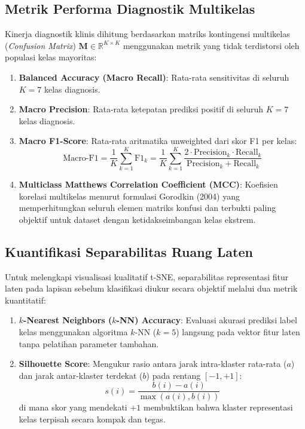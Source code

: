 \subsection{Metrik Performa Diagnostik Multikelas} \label{III.MetrikKlasifikasi}
Kinerja diagnostik klinis dihitung berdasarkan matriks kontingensi multikelas (\textit{Confusion Matrix}) $\mathbf{M} \in \mathbb{R}^{K \times K}$ menggunakan metrik yang tidak terdistorsi oleh populasi kelas mayoritas:
\begin{enumerate}[noitemsep]
	\item \textbf{Balanced Accuracy (Macro Recall)}: Rata-rata sensitivitas di seluruh $K=7$ kelas diagnosis.
	\item \textbf{Macro Precision}: Rata-rata ketepatan prediksi positif di seluruh $K=7$ kelas diagnosis.
	\item \textbf{Macro F1-Score}: Rata-rata aritmatika unweighted dari skor F1 per kelas:
	\begin{equation}
		\text{Macro-F1} = \frac{1}{K} \sum_{k=1}^{K} \text{F1}_k = \frac{1}{K} \sum_{k=1}^{K} \frac{2 \cdot \text{Precision}_k \cdot \text{Recall}_k}{\text{Precision}_k + \text{Recall}_k}
	\end{equation}
	\item \textbf{Multiclass Matthews Correlation Coefficient (MCC)}: Koefisien korelasi multikelas menurut formulasi Gorodkin (2004) \cite{gorodkin2004mcc} yang memperhitungkan seluruh elemen matriks konfusi dan terbukti paling objektif untuk dataset dengan ketidakseimbangan kelas ekstrem.
\end{enumerate}

\subsection{Kuantifikasi Separabilitas Ruang Laten} \label{III.MetrikLaten}
Untuk melengkapi visualisasi kualitatif t-SNE, separabilitas representasi fitur laten pada lapisan sebelum klasifikasi diukur secara objektif melalui dua metrik kuantitatif:
\begin{enumerate}[noitemsep]
	\item \textbf{$k$-Nearest Neighbors ($k$-NN) Accuracy}: Evaluasi akurasi prediksi label kelas menggunakan algoritma $k$-NN ($k=5$) langsung pada vektor fitur laten tanpa pelatihan parameter tambahan.
	\item \textbf{Silhouette Score}: Mengukur rasio antara jarak intra-klaster rata-rata ($a$) dan jarak antar-klaster terdekat ($b$) pada rentang $[-1, +1]$:
	\begin{equation}
		s(i) = \frac{b(i) - a(i)}{\max(a(i), b(i))}
	\end{equation}
	di mana skor yang mendekati $+1$ membuktikan bahwa klaster representasi kelas terpisah secara kompak dan tegas.
\end{enumerate}

